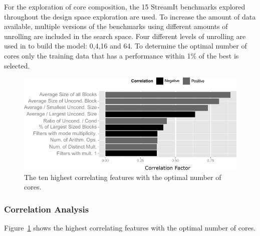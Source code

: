 For the exploration of core composition, the 15 StreamIt benchmarks explored throughout the design space exploration are used. %
To increase the amount of data available, multiple versions of the benchmarks using different amounts of unrolling are included in the search space.
Four different levels of unrolling are used in to build the model: 0,4,16 and 64.
To determine the optimal number of cores only the training data that has a performance within 1\% of the best is selected.

\begin{figure}[t]
\centering
  \includegraphics[width=1\textwidth]{streamit-paper/graphics/corrGraph_remix2.pdf}
  \caption{The ten highest correlating features with the optimal number of cores.}\label{fig:corrCore}
\end{figure}


\subsubsection{Correlation Analysis}

Figure~\ref{fig:corrCore} shows the highest correlating features with the optimal number of cores.

